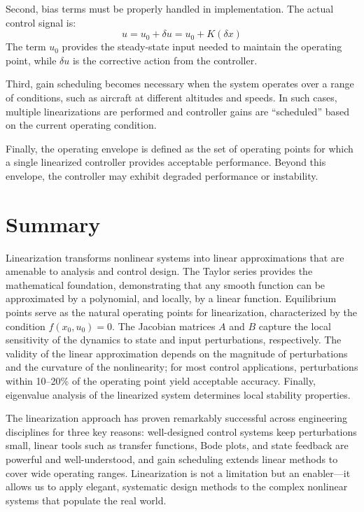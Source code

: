 Second, bias terms must be properly handled in implementation. The actual control signal is:
\begin{equation}
u = u_0 + \delta u = u_0 + K(\delta x)
\end{equation}
The term $u_0$ provides the steady-state input needed to maintain the operating point, while $\delta u$ is the corrective action from the controller.

Third, gain scheduling becomes necessary when the system operates over a range of conditions, such as aircraft at different altitudes and speeds. In such cases, multiple linearizations are performed and controller gains are ``scheduled'' based on the current operating condition.

Finally, the operating envelope is defined as the set of operating points for which a single linearized controller provides acceptable performance. Beyond this envelope, the controller may exhibit degraded performance or instability.

\section{Summary}

Linearization transforms nonlinear systems into linear approximations that are amenable to analysis and control design. The Taylor series provides the mathematical foundation, demonstrating that any smooth function can be approximated by a polynomial, and locally, by a linear function. Equilibrium points serve as the natural operating points for linearization, characterized by the condition $f(x_0, u_0) = 0$. The Jacobian matrices $A$ and $B$ capture the local sensitivity of the dynamics to state and input perturbations, respectively. The validity of the linear approximation depends on the magnitude of perturbations and the curvature of the nonlinearity; for most control applications, perturbations within 10--20\% of the operating point yield acceptable accuracy. Finally, eigenvalue analysis of the linearized system determines local stability properties.

The linearization approach has proven remarkably successful across engineering disciplines for three key reasons: well-designed control systems keep perturbations small, linear tools such as transfer functions, Bode plots, and state feedback are powerful and well-understood, and gain scheduling extends linear methods to cover wide operating ranges. Linearization is not a limitation but an enabler---it allows us to apply elegant, systematic design methods to the complex nonlinear systems that populate the real world.

